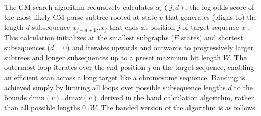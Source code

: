 \documentclass[11pt]{article}
\begin{document}
The CM search algorithm recursively calculates $\alpha_v(j,d)$, the
log odds score of the most likely CM parse subtree rooted at state $v$
that generates (aligns to) the length $d$ subsequence $x_{j-d+1}..x_j$
that ends at position $j$ of target sequence $x$
\cite{Eddy94,Durbin98}. This calculation initializes at the smallest
subgraphs ($E$ states) and shortest subsequences ($d=0$) and iterates
upwards and outwards to progressively larger subtrees and longer
subsequences up to a preset maximum hit length $W$. The outermost loop
iterates over the end position $j$ on the target sequence, enabling an
efficient scan across a long target like a chromosome sequence.
Banding is achieved simply by limiting all loops over possible
subsequence lengths $d$ to the bounds
$\mbox{dmin}(v)..\mbox{dmax}(v)$ derived in the band calculation
algorithm, rather than all possible lengths $0..W$. The banded version
of the algorithm is as follows:
 
\end{document}
